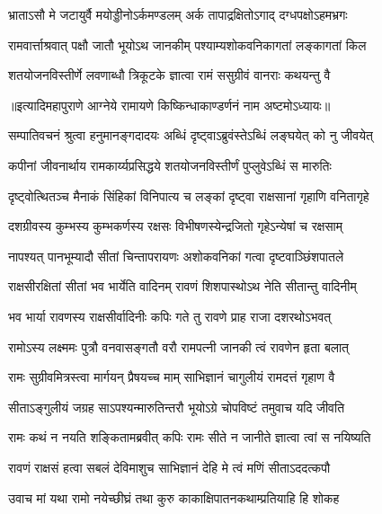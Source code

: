 \twolineshloka
{भ्राताऽसौ मे जटायुर्वै मयोड्डीनोऽर्कमण्डलम्}
{अर्क तापाद्रक्षितोऽगाद् दग्धपक्षोऽहमभ्रगः}%

\twolineshloka
{रामवार्त्ताश्रवात् पक्षौ जातौ भूयोऽथ जानकीम्}
{पश्याम्यशोकवनिकागतां लङ्कागतां किल}%

\twolineshloka
{शतयोजनविस्तीर्णे लवणाब्धौ त्रिकूटके}
{ज्ञात्वा रामं ससुग्रीवं वानराः कथयन्तु वै}%

॥इत्यादिमहापुराणे आग्नेये रामायणे किष्किन्धाकाण्डर्णनं नाम अष्टमोऽध्यायः॥


\twolineshloka
{सम्पातिवचनं श्रुत्वा हनुमानङ्गदादयः}
{अब्धिं दृष्ट्वाऽब्रुवंस्तेऽब्धिं लङ्घयेत् को नु जीवयेत्}%

\twolineshloka
{कपीनां जीवनार्थाय रामकार्य्यप्रसिद्धये}
{शतयोजनविस्तीर्णं पुप्लुवेऽब्धिं स मारुतिः}%

\twolineshloka
{दृष्ट्वोत्थितञ्च मैनाकं सिंहिकां विनिपात्य च }
{लङ्कां दृष्ट्वा राक्षसानां गृहाणि वनितागृहे}%

\twolineshloka
{दशग्रीवस्य कुम्भस्य कुम्भकर्णस्य रक्षसः}
{विभीषणस्येन्द्रजितो गृहेऽन्येषां च रक्षसाम्}%

\twolineshloka
{नापश्यत् पानभूम्यादौ सीतां चिन्तापरायणः}
{अशोकवनिकां गत्वा दृष्टवाञ्छिंशपातले}%

\twolineshloka
{राक्षसीरक्षितां सीतां भव भार्येति वादिनम्}
{रावणं शिशपास्थोऽथ नेति सीतान्तु वादिनीम्}%

\twolineshloka
{भव भार्या रावणस्य राक्षसीर्वादिनीः कपिः}
{गते तु रावणे प्राह राजा दशरथोऽभवत्}%

\twolineshloka
{रामोऽस्य लक्ष्ममः पुत्रौ वनवासङ्गतौ वरौ}
{रामपत्नी जानकी त्वं रावणेन हृता बलात्}%

\twolineshloka
{रामः सुग्रीवमित्रस्त्वा मार्गयन् प्रैषयच्च माम् }
{साभिज्ञानं चागुलीयं रामदत्तं गृहाण वै}%

\twolineshloka
{सीताऽङ्गुलीयं जग्रह साऽपश्यन्मारुतिन्तरौ}
{भूयोऽग्रे चोपविष्टं तमुवाच यदि जीवति}%

\twolineshloka
{रामः कथं न नयति शङ्कितामब्रवीत् कपिः}
{रामः सीते न जानीते ज्ञात्वा त्वां स नयिष्यति}%

\twolineshloka
{रावणं राक्षसं हत्वा सबलं देविमाशुच}
{साभिज्ञानं देहि मे त्वं मणिं सीताऽददत्कपौ}%

\twolineshloka
{उवाच मां यथा रामो नयेच्छीघ्रं तथा कुरु}
{काकाक्षिपातनकथाम्प्रतियाहि हि शोकह}%


